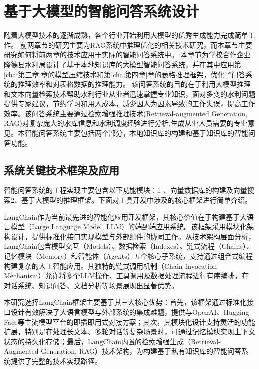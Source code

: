 \chapter{基于大模型的智能问答系统设计}
\label{cha:第五章}

随着大模型技术的逐渐成熟，各个行业开始利用大模型的优秀生成能力完成简单工作。
前两章节的研究主要为RAG系统中推理优化的相关技术研究，而本章节主要研究如何将前两章的技术应用于实际的智能问答系统中。
本章节为学校合作企业隆德县水利局设计了基于本地知识库的大模型智能问答系统，并在其中应用第\ref{cha:第三章}章的模型压缩技术和第\ref{cha:第四章}章的表格推理框架，优化了问答系统的推理效率和对表格数据的推理能力。
该问答系统的目的在于利用大模型推理和文本向量检索技术帮助水利行业从业者迅速掌握专业知识，面对多变的水利问题提供专家建议，节约学习和用人成本，减少因人为因素导致的工作失误，提高工作效率。该问答系统主要通过检索增强推理技术(Retrieval-augmented Generation, RAG)对复杂庞大的水库信息和水利调度经验进行分析,生成从业人员需要的专业意见。本智能问答系统主要包括两个部分，本地知识库的构建和基于知识库的智能问答功能。
\section{系统关键技术框架及应用}

智能问答系统的工程实现主要包含以下功能模块：1 、向量数据库的构建及向量搜索2、基于大模型的推理框架。下面对工具开发中涉及的核心框架进行简单介绍。

LangChain作为当前最先进的智能化应用开发框架，其核心价值在于构建基于大语言模型（Large Language Model, LLM）的端到端应用系统。该框架采用模块化架构设计，提供标准化接口实现模型与外部组件的协同工作。从技术架构层面分析，LangChain包含模型交互（Models）、数据检索（Indexes）、链式流程（Chains）、记忆模块（Memory）和智能体（Agents）五个核心子系统，支持通过组合式编程构建复杂的人工智能应用。其独特的链式调用机制（Chain Invocation Mechanism）允许将多个LLM操作、工具调用及数据处理流程进行有序编排，在对话系统、知识问答、文档分析等场景展现出显著优势。

本研究选择LangChain框架主要基于其三大核心优势：首先，该框架通过标准化接口设计有效解决了大语言模型与外部系统的集成难题，提供与OpenAI、Hugging Face等主流模型平台的即插即用式对接方案；其次，其模块化设计支持灵活的功能扩展，特别是在处理长文本、多轮对话等复杂场景时，可通过记忆模块实现上下文状态的持久化存储；最后，LangChain内置的检索增强生成（Retrieval-Augmented Generation, RAG）技术架构，为构建基于私有知识库的智能问答系统提供了完整的技术实现路径。

